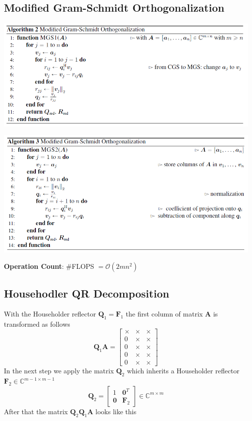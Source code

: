 \documentclass[english]{latex4ei/latex4ei_sheet}
\begin{document}
\begin{sectionbox}
    \subsection{Modified Gram-Schmidt Orthogonalization}
    \includegraphics[width=\textwidth]{img/modified_gram_schmidt}

    \includegraphics[width=\textwidth]{img/classic_gram_schmidt2.png}

    \textbf{Operation Count}: \#FLOPS $=\mathcal{O}(2mn^2)$
\end{sectionbox}
\begin{sectionbox}
    \subsection{Househodler QR Decomposition}

    With the Householder reflector $\mathbf{Q}_1 = \mathbf{F}_1$ the first column of matrix $\mathbf{A}$ is transformed as follows
    $$\mathbf{Q}_1 \mathbf{A} = \begin{bmatrix}
            \times & \times & \times \\
            0      & \times & \times \\
            0      & \times & \times \\
            0      & \times & \times \\
            0      & \times & \times
        \end{bmatrix}$$
    In the next step we apply the matrix $\mathbf{Q}_2$ which inherits a Householder reflector $\mathbf{F}_2\in\mathbb{C}^{m-1\times m-1}$
    $$\mathbf{Q}_2 = \begin{bmatrix}
            1          & \mathbf{0}^T \\
            \mathbf{0} & \mathbf{F}_2
        \end{bmatrix} \in \mathbb{C}^{m \times m}$$
    After that the matrix $\mathbf{Q}_2\mathbf{Q}_1\mathbf{A}$ looks like this
\end{sectionbox}
\end{document}
